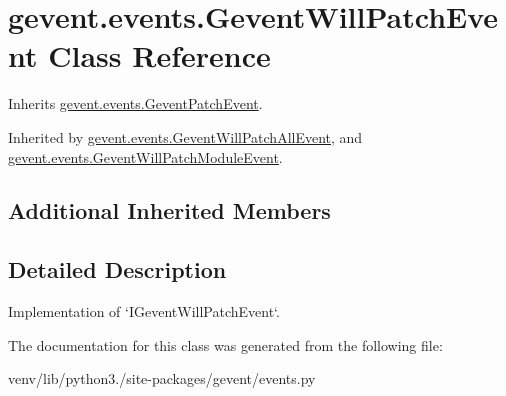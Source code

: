 \hypertarget{classgevent_1_1events_1_1_gevent_will_patch_event}{}\section{gevent.\+events.\+Gevent\+Will\+Patch\+Event Class Reference}
\label{classgevent_1_1events_1_1_gevent_will_patch_event}


Inherits \hyperlink{classgevent_1_1events_1_1_gevent_patch_event}{gevent.\+events.\+Gevent\+Patch\+Event}.



Inherited by \hyperlink{classgevent_1_1events_1_1_gevent_will_patch_all_event}{gevent.\+events.\+Gevent\+Will\+Patch\+All\+Event}, and \hyperlink{classgevent_1_1events_1_1_gevent_will_patch_module_event}{gevent.\+events.\+Gevent\+Will\+Patch\+Module\+Event}.

\subsection*{Additional Inherited Members}


\subsection{Detailed Description}
\begin{DoxyVerb}Implementation of `IGeventWillPatchEvent`.
\end{DoxyVerb}
 

The documentation for this class was generated from the following file\+:\begin{DoxyCompactItemize}
\item 
venv/lib/python3./site-\/packages/gevent/events.\+py\end{DoxyCompactItemize}
